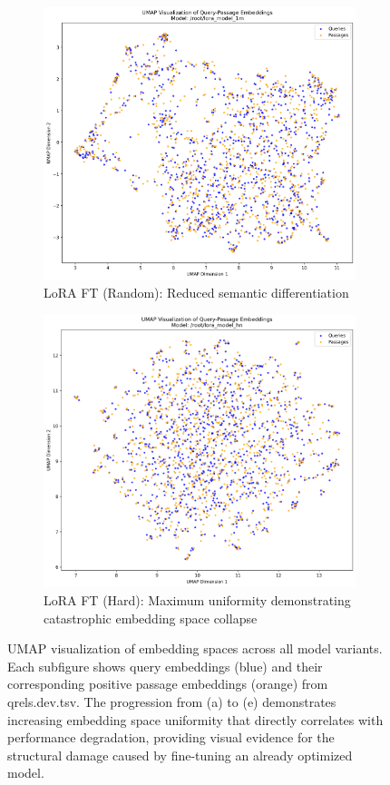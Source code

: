 \documentclass[conference]{IEEEtran}
\begin{document}
\begin{figure}[t]
\begin{subfigure}{0.32\textwidth}
\includegraphics[width=\textwidth]{umap_visualization__root_lora_model_1m.png}
\caption{LoRA FT (Random): Reduced semantic differentiation}
\label{fig:umap_lora_random}
\end{subfigure}
\hfill
\begin{subfigure}{0.32\textwidth}
\includegraphics[width=\textwidth]{umap_visualization__root_lora_model_hn.png}
\caption{LoRA FT (Hard): Maximum uniformity demonstrating catastrophic embedding space collapse}
\label{fig:umap_lora_hard}
\end{subfigure}

\caption{UMAP visualization of embedding spaces across all model variants. Each subfigure shows query embeddings (blue) and their corresponding positive passage embeddings (orange) from qrels.dev.tsv. The progression from (a) to (e) demonstrates increasing embedding space uniformity that directly correlates with performance degradation, providing visual evidence for the structural damage caused by fine-tuning an already optimized model.}
\label{fig:umap_all}
\end{figure}
\end{document}
